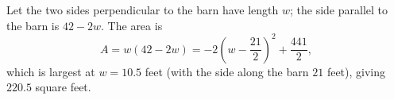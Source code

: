Let the two sides perpendicular to the barn have length $w$; the side parallel to the barn is $42-2w$. The area is
\[
A=w(42-2w)=-2\left(w-\dfrac{21}{2}\right)^2+\dfrac{441}{2},
\]
which is largest at $w=10.5$ feet (with the side along the barn $21$ feet), giving $\boxed{220.5}$ square feet.
